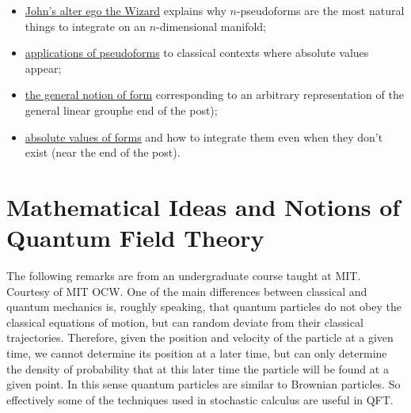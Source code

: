 \documentclass[preprint, 5p, 10pt]{elsarticle}
\theoremstyle{plain}
\begin{document}
\begin{itemize}%
\item \href{http://groups.google.com/group/sci.physics.research/msg/3c6a1a7237b66c8c?dmode=source}{John'{}s alter ego the Wizard} explains why $n$-pseudoforms are the most natural things to integrate on an $n$-dimensional manifold;
\item \href{http://groups.google.com/group/sci.physics.research/msg/2774cbbc982e200e?dmode=source}{applications of pseudoforms} to classical contexts where absolute values appear;
\item \href{http://groups.google.com/group/sci.physics.research/msg/47bbd29289f208f8?dmode=source}{the general notion of form} corresponding to an arbitrary representation of the general linear grouphe end of the post);
\item \href{http://groups.google.com/group/sci.physics.research/msg/424da828e75b6b90?dmode=source}{absolute values of forms} and how to integrate them even when they don'{}t exist (near the end of the post).

\end{itemize}
\section{Mathematical Ideas and Notions of Quantum Field Theory}
The following remarks are from an undergraduate course taught at MIT. Courtesy of MIT OCW.
One of the main differences between classical and quantum mechanics is, roughly speaking, that quantum particles do not obey the classical
equations of motion, but can random deviate from their classical trajectories. Therefore, given the position and velocity of the particle
at a given time, we cannot determine its position at a later time, but can only determine the density of probability that at this later time 
the particle will be found at a given point. In this sense quantum particles are similar to Brownian particles. So effectively some of 
the techniques used in stochastic calculus are useful in QFT.
\end{document}
